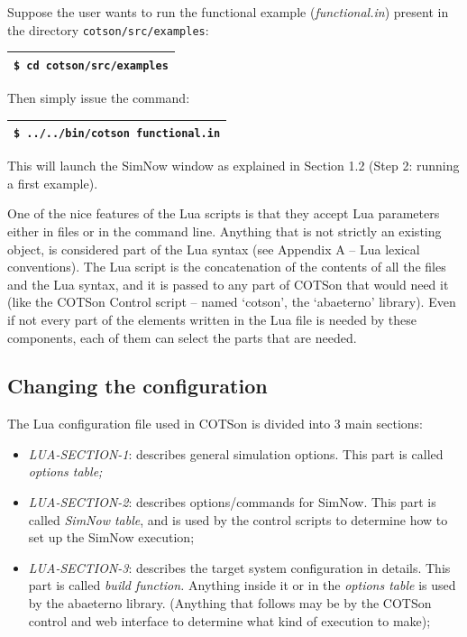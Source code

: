 \documentclass[a4paper]{article}
\begin{document}
{
Suppose the user wants to run the functional example
(\textit{functional.in}) present in the directory
\texttt{cotson/src/examples}:}

\begin{flushleft}
\tablehead{}
\begin{supertabular}{|m{6.29346in}|}
\hline
{} \texttt{\$ cd cotson/src/examples}\\\hline
\end{supertabular}
\end{flushleft}
{
Then simply issue the command:}

\begin{flushleft}
\tablehead{}
\begin{supertabular}{|m{6.29346in}|}
\hline
{} \texttt{\$ ../../bin/cotson
functional.in}\\\hline
\end{supertabular}
\end{flushleft}
{
This will launch the SimNow window as explained in Section 1.2 (Step 2:
running a first example).}

{
One of the nice features of the Lua scripts is that they accept Lua
parameters either in files or in the command line. Anything that is not
strictly an existing object, is considered part of the Lua syntax (see
Appendix A -- Lua lexical conventions). The Lua script is the
concatenation of the contents of all the files and the Lua syntax, and
it is passed to any part of COTSon that would need it (like the COTSon
Control script -- named {\textquoteleft}cotson{\textquoteright}, the
{\textquoteleft}abaeterno{\textquoteright} library). Even if not every
part of the elements written in the Lua file is needed by these
components, each of them can select the parts that are needed.}

\subsection[Changing the configuration]{Changing the
\foreignlanguage{english}{configuration}}
{
The Lua configuration file used in COTSon is divided into 3 main
sections:}

\begin{itemize}
\item {
\textit{LUA-SECTION-1}: describes general simulation options. This part
is called \textit{options table;}}
\item {
\textit{LUA-SECTION-2}: describes options/commands for SimNow. This part
is called \textit{SimNow table}, and is used by the control scripts to
determine how to set up the SimNow execution;}
\item {
\textit{LUA-SECTION-3}: describes the target system configuration in
details. This part is called \textit{build function. }Anything inside
it or in the \textit{options table} is used by the abaeterno library.
(Anything that follows may be by the COTSon control and web interface
to determine what kind of execution to make);}
\end{itemize}
\end{document}
